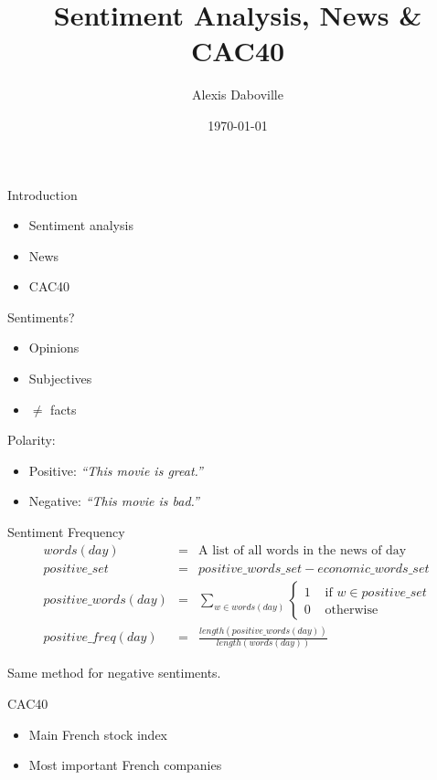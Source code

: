 \documentclass{beamer}
\title{Sentiment Analysis, News \& CAC40}
\author{Alexis Daboville}
\institute{Trinity College Dublin}
\date{\today}
\begin{document}
\begin{frame}
	\titlepage
\end{frame}

\begin{frame}{Introduction}
	\begin{itemize}
		\item Sentiment analysis
		\item News
		\item CAC40
	\end{itemize}
\end{frame}

\begin{frame}{Sentiments?}
	\begin{itemize}
		\item Opinions
		\item Subjectives
		\item $\neq$ facts
	\end{itemize}

	\pause

	Polarity:
	\begin{itemize}
		\item Positive: \emph{``This movie is {\color{green}great}.''}
		\item Negative: \emph{``This movie is {\color{red}bad}.''}
	\end{itemize}
\end{frame}

\begin{frame}{Sentiment Frequency}
	\begin{eqnarray*}
		words(day) &=& \textrm{A list of all words in the news of day}\\
  positive\_set &=& positive\_words\_set - economic\_words\_set\\
	positive\_words(day) &=& \sum_{w \in words(day)} \begin{cases}1 & \textrm{ if }w \in positive\_set\\ 0 & \mbox{ otherwise }\end{cases}\\
		positive\_freq(day) &=& \frac{length(positive\_words(day))}{length(words(day))}
	\end{eqnarray*}

	\pause

	Same method for negative sentiments.

\end{frame}

\begin{frame}{CAC40}
	\begin{itemize}
		\item Main French stock index
		\item Most important French companies
	\end{itemize}
\end{frame}
\end{document}
